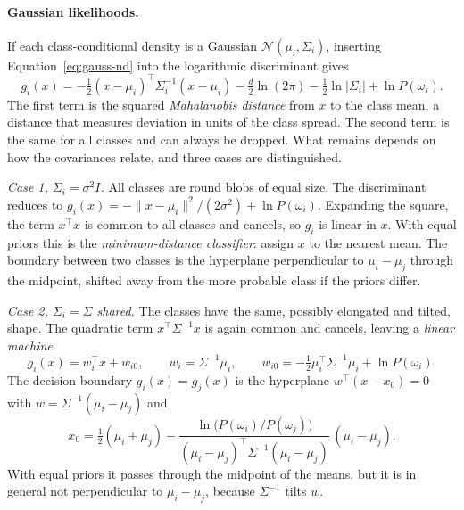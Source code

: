 \paragraph{Gaussian likelihoods.}
If each class-conditional density is a Gaussian $\mathcal N(\mu_i,\Sigma_i)$,
inserting Equation~\eqref{eq:gauss-nd} into the logarithmic discriminant gives
\begin{equation}
  g_i(x) = -\tfrac12 (x-\mu_i)^\top\Sigma_i^{-1}(x-\mu_i)
  - \tfrac{d}{2}\ln(2\pi) - \tfrac12\ln\lvert\Sigma_i\rvert + \ln P(\omega_i).
  \label{eq:gauss-discr}
\end{equation}
\noindent
The first term is the squared \emph{Mahalanobis distance} from $x$ to the class
mean, a distance that measures deviation in units of the class spread. The
second term is the same for all classes and can always be dropped. What remains
depends on how the covariances relate, and three cases are distinguished.

\emph{Case 1, $\Sigma_i = \sigma^2 I$.} All classes are round blobs of equal
size. The discriminant reduces to
$g_i(x) = -\lVert x-\mu_i\rVert^2/(2\sigma^2) + \ln P(\omega_i)$. Expanding the
square, the term $x^\top x$ is common to all classes and cancels, so $g_i$ is
linear in $x$. With equal priors this is the \emph{minimum-distance
classifier}: assign $x$ to the nearest mean. The boundary between two classes is
the hyperplane perpendicular to $\mu_i-\mu_j$ through the midpoint, shifted
away from the more probable class if the priors differ.

\emph{Case 2, $\Sigma_i = \Sigma$ shared.} The classes have the same, possibly
elongated and tilted, shape. The quadratic term $x^\top\Sigma^{-1}x$ is again
common and cancels, leaving a \emph{linear machine}
\begin{equation}
  g_i(x) = w_i^\top x + w_{i0},
  \qquad
  w_i = \Sigma^{-1}\mu_i,
  \qquad
  w_{i0} = -\tfrac12\mu_i^\top\Sigma^{-1}\mu_i + \ln P(\omega_i).
\end{equation}
\noindent
The decision boundary $g_i(x) = g_j(x)$ is the hyperplane
$w^\top(x-x_0) = 0$ with $w = \Sigma^{-1}(\mu_i-\mu_j)$ and
\begin{equation}
  x_0 = \tfrac12(\mu_i+\mu_j)
  - \frac{\ln\bigl(P(\omega_i)/P(\omega_j)\bigr)}
         {(\mu_i-\mu_j)^\top\Sigma^{-1}(\mu_i-\mu_j)}\,(\mu_i-\mu_j).
\end{equation}
\noindent
With equal priors it passes through the midpoint of the means, but it is in
general not perpendicular to $\mu_i-\mu_j$, because $\Sigma^{-1}$ tilts $w$.

